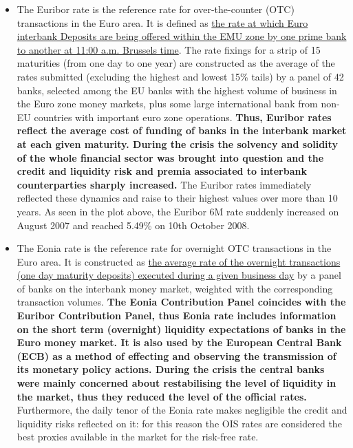 \begin{itemize}
\tightlist
\item
  The Euribor rate is the reference rate for over-the-counter (OTC)
  transactions in the Euro area. It is defined as \underline{the rate at which
  Euro interbank Deposits are being offered within the EMU zone by one
  prime bank to another at 11:00 a.m. Brussels time}. The rate fixings
  for a strip of 15 maturities (from one day to one year) are
  constructed as the average of the rates submitted (excluding the
  highest and lowest 15\% tails) by a panel of 42 banks, selected
  among the EU banks with the highest volume of business in the Euro
  zone money markets, plus some large international bank from non-EU
  countries with important euro zone operations. \textbf{Thus, Euribor
  rates reflect the average cost of funding of banks in the interbank
  market at each given maturity. During the crisis the solvency and
  solidity of the whole financial sector was brought into question and
  the credit and liquidity risk and premia associated to interbank
  counterparties sharply increased.} The Euribor rates immediately
  reflected these dynamics and raise to their highest values over more
  than 10 years. As seen in the plot above, the Euribor 6M rate suddenly
  increased on August 2007 and reached 5.49\% on 10th October 2008.
\item
  The Eonia rate is the reference rate for overnight OTC transactions in
  the Euro area. It is constructed as \underline{the average rate of the overnight
  transactions (one day maturity deposits) executed during a given
  business day} by a panel of banks on the interbank money market,
  weighted with the corresponding transaction volumes. \textbf{The Eonia
  Contribution Panel coincides with the Euribor Contribution Panel, thus
  Eonia rate includes information on the short term (overnight)
  liquidity expectations of banks in the Euro money market. It is also
  used by the European Central Bank (ECB) as a method of effecting and
  observing the transmission of its monetary policy actions. During the
  crisis the central banks were mainly concerned about restabilising the
  level of liquidity in the market, thus they reduced the level of the
  official rates.} Furthermore, the daily tenor of the Eonia rate makes
  negligible the credit and liquidity risks reflected on it: for this
  reason the OIS rates are considered the best proxies available in the
  market for the risk-free rate.
\end{itemize}

